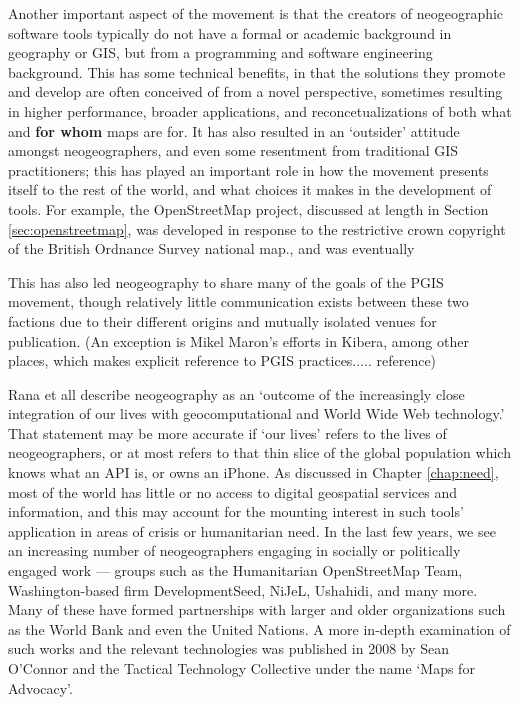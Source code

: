 \documentclass[11pt]{report}
\begin{document}
Another important aspect of the movement is that the creators of neogeographic software tools typically do not have a formal or academic background in geography or GIS, but from a programming and software engineering background. This has some technical benefits, in that the solutions they promote and develop are often conceived of from a novel perspective, sometimes resulting in higher performance, broader applications, and reconcetualizations of both what and \textbf{for whom} maps are for. It has also resulted in an `outsider' attitude amongst neogeographers, and even some resentment from traditional GIS practitioners; this has played an important role in how the movement presents itself to the rest of the world, and what choices it makes in the development of tools. For example, the OpenStreetMap project, discussed at length in Section \ref{sec:openstreetmap}, was developed in response to the restrictive crown copyright of the British Ordnance Survey national map.\cite{chilton-crowdsourcing}, and was eventually 

This has also led neogeography to share many of the goals of the PGIS movement, though relatively little communication exists between these two factions due to their different origins and mutually isolated venues for publication. (An exception is Mikel Maron's efforts in Kibera, among other places, which makes explicit reference to PGIS practices..... reference)




Rana et all describe neogeography as an `outcome of the increasingly close integration of our lives with geocomputational and World Wide Web technology.' That statement may be more accurate if `our lives' refers to the lives of neogeographers, or at most refers to that thin slice of the global population which knows what an API is, or owns an iPhone. As discussed in Chapter \ref{chap:need}, most of the world has little or no access to digital geospatial services and information, and this may account for the mounting interest in such tools' application in areas of crisis or humanitarian need. In the last few years, we see an increasing number of neogeographers engaging in socially or politically engaged work --- groups such as the Humanitarian OpenStreetMap Team, Washington-based firm DevelopmentSeed, NiJeL, Ushahidi, and many more. Many of these have formed partnerships with larger and older organizations such as the World Bank and even the United Nations. A more in-depth examination of such works and the relevant technologies was published in 2008 by Sean O'Connor and the Tactical Technology Collective under the name `Maps for Advocacy'. \cite{oconnor2008maps} 
\end{document}
